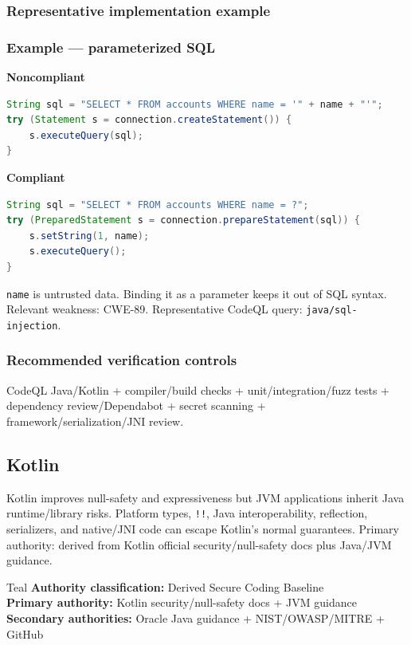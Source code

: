 \documentclass[10pt,letterpaper]{article}
\newcommand{\code}[1]{\texttt{\small #1}}
\begin{document}
\subsubsection*{Representative implementation example}
\subsubsection*{Example --- parameterized SQL}

\textbf{Noncompliant}\par
\begin{lstlisting}[language={Java}]
String sql = "SELECT * FROM accounts WHERE name = '" + name + "'";
try (Statement s = connection.createStatement()) {
    s.executeQuery(sql);
}
\end{lstlisting}

\textbf{Compliant}\par
\begin{lstlisting}[language={Java}]
String sql = "SELECT * FROM accounts WHERE name = ?";
try (PreparedStatement s = connection.prepareStatement(sql)) {
    s.setString(1, name);
    s.executeQuery();
}
\end{lstlisting}

\code{name} is untrusted data. Binding it as a parameter keeps it out of SQL syntax. Relevant weakness: CWE-89. Representative CodeQL query: \code{java/sql-injection}.\par
\subsubsection*{Recommended verification controls}
CodeQL Java/Kotlin + compiler/build checks + unit/integration/fuzz tests + dependency review/Dependabot + secret scanning + framework/serialization/JNI review.
\clearpage
\subsection{Kotlin}
Kotlin improves null-safety and expressiveness but JVM applications inherit Java runtime/library risks. Platform types, \code{!!}, Java interoperability, reflection, serializers, and native/JNI code can escape Kotlin's normal guarantees. Primary authority: derived from Kotlin official security/null-safety docs plus Java/JVM guidance.
\begin{callout}{Teal}
\textbf{Authority classification:} Derived Secure Coding Baseline\\
\textbf{Primary authority:} Kotlin security/null-safety docs + JVM guidance\\
\textbf{Secondary authorities:} Oracle Java guidance + NIST/OWASP/MITRE + GitHub
\end{callout}
\end{document}
